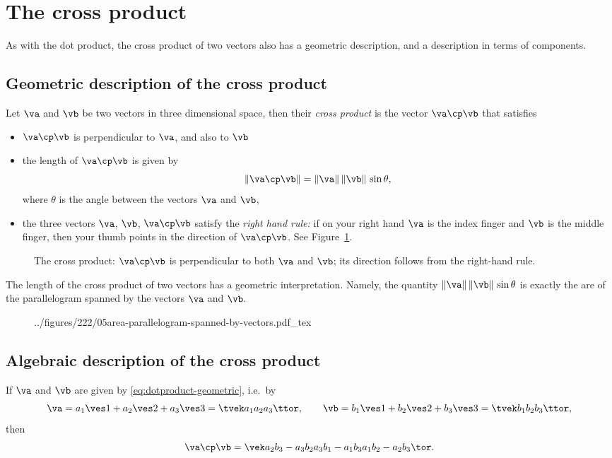 \section{The cross product} %
As with the dot product, the cross product of two vectors also has a
geometric description, and a description in terms of components.

\subsection{Geometric description of the cross product} Let $\va$
and $\vb$ be two vectors in three dimensional space, then their
\emph{cross product} is the vector $\va\cp\vb$ that satisfies
\begin{itemize}
\item $\va\cp\vb$ is perpendicular to $\va$, and also to $\vb$
\item the length of $\va\cp\vb$ is given by
  \[
  \|\va\cp\vb\| = \|\va\|\,\|\vb\|\,\sin\theta,
  \]
  where $\theta$ is the angle between the vectors $\va$ and $\vb$,
\item the three vectors $\va$, $\vb$, $\va\cp\vb$ satisfy the
  \emph{right hand rule:} if on your right hand $\va$ is the index
  finger and $\vb$ is the middle finger, then your thumb points in the
  direction of $\va\cp\vb$.  See Figure~\ref{fig:cross-product}.
\end{itemize}
\begin{figure}[t]
  
  \caption{The cross product: $\va\cp\vb$ is perpendicular to both
    $\va$ and $\vb$; its direction follows from the right-hand rule. }
  \label{fig:cross-product}
\end{figure}
The length of the cross product of two vectors has a geometric
interpretation.  Namely, the quantity $\|\va\|\,\|\vb\|\,\sin\theta$
is exactly the are of the parallelogram spanned by the vectors $\va$
and $\vb$.
\begin{figure}[h]
  
  ../figures/222/05area-parallelogram-spanned-by-vectors.pdf_tex
\end{figure}

\subsection{Algebraic description of the cross product} If $\va$
and $\vb $ are given by \eqref{eq:dotproduct-geometric}, i.e.~by
\[
\va = a_1\ves1+a_2\ves2+a_3\ves3=\tvek a_1 \\ a_2 \\ a_3 \ttor,\qquad
\vb = b_1\ves1+b_2\ves2+b_3\ves3=\tvek b_1 \\ b_2 \\ b_3 \ttor,
\]
then
\[
\va \cp\vb = \vek
a_2b_3 - a_3b_2\\
a_3b_1 - a_1b_3\\
a_1b_2 - a_2b_3 \tor.
\]

